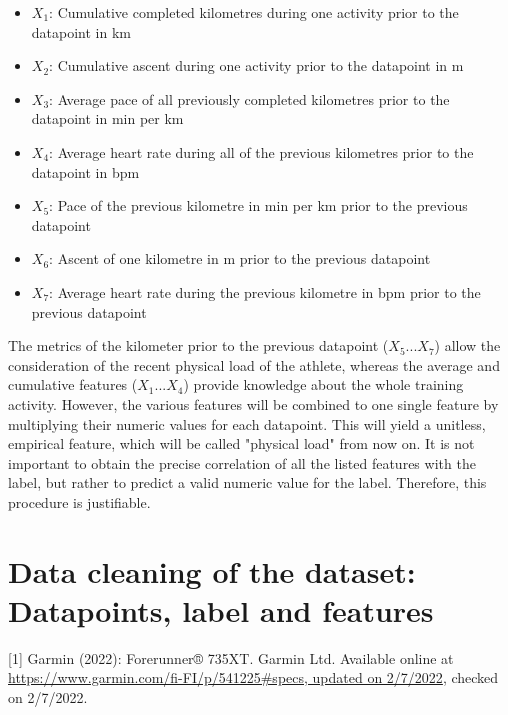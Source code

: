 \documentclass[11pt]{article}
\begin{document}
\begin{itemize}
  \itemsep0pt
  \item ${X_1}$: Cumulative completed kilometres during one activity prior to the datapoint in km
  \item ${X_2}$: Cumulative ascent during one activity prior to the datapoint in m
  \item ${X_3}$: Average pace of all previously completed kilometres prior to the datapoint in min per km
  \item ${X_4}$: Average heart rate during all of the previous kilometres prior to the datapoint in bpm
  \item ${X_5}$: Pace of the previous kilometre in min per km prior to the previous datapoint
  \item ${X_6}$: Ascent of one kilometre in m prior to the previous datapoint
  \item ${X_7}$: Average heart rate during the previous kilometre in bpm  prior to the previous datapoint
\end{itemize}

The metrics of the kilometer prior to the previous datapoint ($X_5 ... X_7$) allow the consideration of the recent physical load of the athlete, whereas the average and cumulative features ($X_1 ... X_4$) provide knowledge about the whole training activity.
However, the various features will be combined to one single feature by multiplying their numeric values for each datapoint. This will yield a unitless, empirical feature, which will be called "physical load" from now on.  It is not important to obtain the precise correlation of all the listed features with the label, but rather to predict a valid numeric value for the label. Therefore, this procedure is justifiable.\\


\section{Data cleaning of the dataset: Datapoints, label and features}


[1]	Garmin (2022): Forerunner® 735XT. Garmin Ltd. Available online at    			\url{https://www.garmin.com/fi-FI/p/541225#specs, updated on 2/7/2022}, checked on 2/7/2022.
\end{document}
